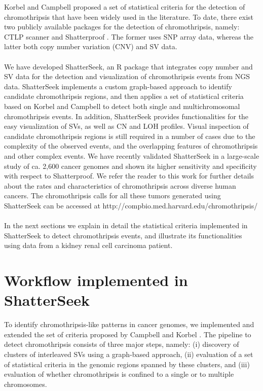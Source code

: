 \documentclass[twoside,a4wide,11pt]{article}\usepackage[]{graphicx}\usepackage[]{color}
\begin{document}
Korbel and Campbell \cite{Korbel2013} proposed a set of statistical criteria for the detection of chromothripsis that have been widely used in the literature. 
To date, there exist two publicly available packages for the detection of chromothripsis, namely: 
CTLP scanner \cite{Cai2014,Yang2016} and Shatterproof \cite{Govind2014}.
The former uses SNP array data, whereas the latter both copy number variation (CNV) and SV data.\\
\\
We have developed ShatterSeek, an R package that integrates copy number and SV data for the detection and 
visualization of chromothripsis events from NGS data.
ShatterSeek implements a custom graph-based approach to identify candidate chromothripsis regions, 
and then applies a set of statistical criteria based on Korbel and Campbell \cite{Korbel2013}
to detect both single and multichromosomal chromothripsis events.
In addition, ShatterSeek provides functionalities for the easy visualization of SVs, 
as well as CN and LOH profiles.
Visual inspection of candidate chromothripsis regions is still required in a number of cases due to the complexity of the observed events, and the overlapping features of chromothripsis and other complex events.
We have recently validated ShatterSeek in a large-scale
study of ca. 2,600 cancer genomes and
shown its higher sensitivity and specificity with respect to Shatterproof.
We refer the reader to this work for further details about the rates and characteristics of chromothripsis across diverse human cancers.
The chromothripsis calls for all these tumors generated using ShatterSeek can be accessed at 
http://compbio.med.harvard.edu/chromothripsis/ \\
\\
In the next sections we explain in detail the statistical criteria implemented in ShatterSeek to detect
chromothripsis events,
and illustrate its functionalities using data from a kidney renal cell carcinoma patient.

\section{Workflow implemented in ShatterSeek}
To identify chromothripsis-like patterns in cancer genomes, we implemented and extended 
the set of  criteria proposed by Campbell and Korbel \cite{Korbel2013}. 
The pipeline to detect chromothripsis consists of three major steps, namely:
(i) discovery of clusters of interleaved SVs using a graph-based approach,
(ii) evaluation of a set of statistical criteria in the genomic regions spanned by these clusters,
and (iii) evaluation of whether chromothripsis is confined to a single or to multiple chromosomes.\\
\\
\end{document}
